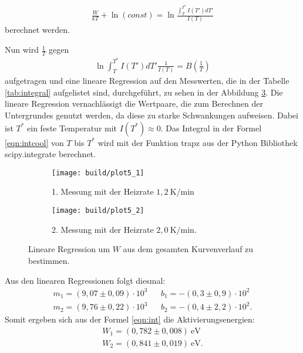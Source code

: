 \begin{align}
  \frac{W}{kT}+\ln{(const)}=\ln \frac{\int_T^{T^*}{I(T')dT'}}{I(T)} \label{eqn:int}
\end{align}
berechnet werden.

Nun wird $\frac{1}{T}$ gegen
\begin{align}
  \ln \int_T^{T^*}I(T')dT'\frac{1}{I(T)}=B(\frac{1}{T}) \label{eqn:intcool}
\end{align}
aufgetragen und eine
lineare Regression auf den Messwerten,
die in der Tabelle \ref{tab:integral} aufgelistet sind,
durchgeführt,
zu sehen in der Abbildung \ref{fig:intreg}.
Die lineare Regression vernachlässigt die Wertpaare,
die zum Berechnen der Untergrundes genutzt werden,
da diese zu starke Schwankungen aufweisen.
Dabei ist $T^*$ ein feste Temperatur mit $I(T^*)\approx 0$.
Das Integral in der Formel \ref{eqn:intcool} von $T$ bis $T^*$
wird mit der Funktion trapz aus der Python Bibliothek scipy.integrate
berechnet.





\begin{figure}
  \centering
  \begin{subfigure}{0.49\textwidth}
    \centering
    \texttt{[image: build/plot5\_1]}
    \caption{1. Messung mit der Heizrate $1,2 \ \si{\kelvin\per\minute}$}
    \label{fig:intreg1}
  \end{subfigure}
  \begin{subfigure}{0.49\textwidth}
    \centering
    \texttt{[image: build/plot5\_2]}
    \caption{2. Messung mit der Heizrate $2,0 \ \si{\kelvin\per\minute}$.}
    \label{fig:intreg2}
  \end{subfigure}
\caption{Lineare Regression um $W$ aus dem gesamten Kurvenverlauf zu bestimmen.}
\label{fig:intreg}
\end{figure}
\FloatBarrier
Aus den linearen Regressionen folgt diesmal:
\begin{align*}
  m_1=(9,07\pm0,09)\cdot10^{3}    &  &b_1=-(0,3\pm0,9)\cdot10^{2}\\
  m_2=(9,76\pm0,22)\cdot10^{3}    &  &b_2=-(0,4\pm2,2)\cdot10^{2}.
\end{align*}
Somit ergeben sich aus der Formel \eqref{eqn:int} die Aktivierungsenergien:
\begin{align*}
  W_1=(0,782\pm0,008)\ \si{\electronvolt}\\
  W_2=(0,841\pm0,019)\ \si{\electronvolt}.
\end{align*}


